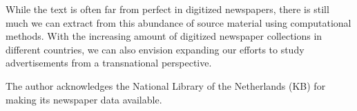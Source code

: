 \documentclass[USenglish]{article}
\begin{document}
While the text is often far from perfect in digitized newspapers, there is still much we can extract from this abundance of source material using computational methods. With the increasing amount of digitized newspaper collections in different countries, we can also envision expanding our efforts to study advertisements from a transnational perspective.


\begin{acknowledgement}
The author acknowledges the National Library of the Netherlands (KB) for making its newspaper data available.

\end{acknowledgement}



\end{document}
